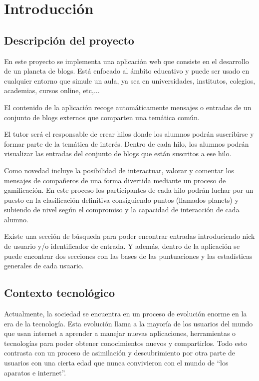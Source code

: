 \documentclass[a4paper, 12pt]{book}
\begin{document}
\cleardoublepage
\chapter{Introducci\'on}
\label{sec:intro} %

\section{Descripci\'on del proyecto}
\label{sec:descripcion}
En este proyecto se implementa una aplicaci\'on web que consiste en el desarrollo de un planeta de blogs. Est\'a enfocado al \'ambito educativo y puede
ser usado en cualquier entorno que simule un aula, ya sea en universidades, institutos, colegios, academias, cursos online, etc,...

El contenido de la aplicaci\'on recoge autom\'aticamente mensajes o entradas de un conjunto de blogs externos que comparten una tem\'atica com\'un.

El tutor ser\'a el responsable de crear hilos donde los alumnos podr\'an suscribirse y formar parte de la tem\'atica de inter\'es. Dentro de cada hilo,
los alumnos podr\'an visualizar las entradas del conjunto de blogs que est\'an suscritos a ese hilo.

Como novedad incluye la posibilidad de interactuar, valorar y comentar los mensajes de compa\~neros de una forma divertida mediante un proceso de 
gamificaci\'on. En este proceso los participantes de cada hilo podr\'an luchar por un puesto en la clasificaci\'on definitiva consiguiendo 
puntos (llamados planets) y subiendo de nivel seg\'un el compromiso y la capacidad de interacci\'on de cada alumno.

Existe una secci\'on de b\'usqueda para poder encontrar entradas introduciendo nick de usuario y/o identificador de entrada. Y adem\'as, dentro de la
aplicaci\'on se puede encontrar dos secciones con las bases de las puntuaciones y las estad\'isticas generales de cada usuario.

\section{Contexto tecnol\'ogico}
\label{sec:contexto}
Actualmente, la sociedad se encuentra en un proceso de evoluci\'on enorme en la era de la tecnolog\'ia. Esta evoluci\'on llama a la mayor\'ia 
de los usuarios del mundo que usan internet a aprender a manejar nuevas aplicaciones, herramientas o tecnolog\'ias para poder obtener 
conocimientos nuevos y compartirlos.
Todo esto contrasta con un proceso de asimilaci\'on y descubrimiento por otra parte de usuarios con una cierta edad que nunca convivieron con 
el mundo de ``los aparatos e internet''.
\end{document}
